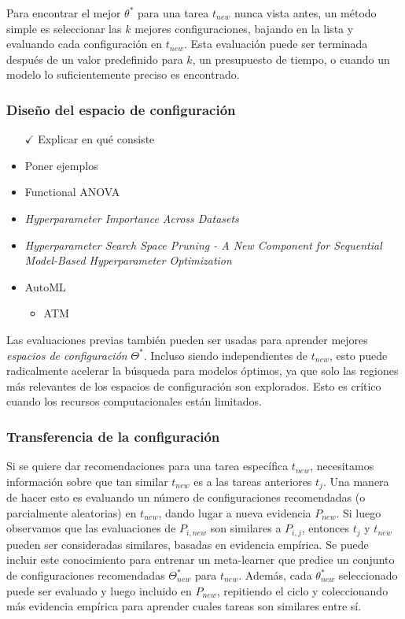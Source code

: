 Para encontrar el mejor $\theta^*$ para una tarea $t_{new}$ nunca vista antes, un método simple es seleccionar las $k$ mejores configuraciones, bajando en la lista y evaluando cada configuración en $t_{new}$. Esta evaluación puede ser terminada después de un valor predefinido para $k$, un presupuesto de tiempo, o cuando un modelo lo suficientemente preciso es encontrado. 

\subsubsection{Diseño del espacio de configuración}

\begin{itemize}
	\item[$\checkmark$] Explicar en qué consiste
	\item Poner ejemplos
	\item Functional ANOVA
	\item \textit{Hyperparameter Importance Across Datasets}
	\item \textit{Hyperparameter Search Space Pruning - A New Component for Sequential Model-Based Hyperparameter Optimization}
	\item AutoML \begin{itemize}
		\item ATM
	\end{itemize}
\end{itemize}


Las evaluaciones previas también pueden ser usadas para aprender mejores \textit{espacios de configuración} $\Theta^*$. Incluso siendo independientes de $t_{new}$, esto puede radicalmente acelerar la búsqueda para modelos óptimos, ya que solo las regiones más relevantes de los espacios de configuración son explorados. Esto es crítico cuando los recursos computacionales están limitados. 

\subsubsection{Transferencia de la configuración}

Si se quiere dar recomendaciones para una tarea específica $t_{new}$, necesitamos información sobre que tan similar $t_{new}$ es a las tareas anteriores $t_j$. Una manera de hacer esto es evaluando un número de configuraciones recomendadas (o parcialmente aleatorias) en $t_{new}$, dando lugar a nueva evidencia $P_{new}$. Si luego observamos que las evaluaciones de $P_{i,new}$ son similares a $P_{i,j}$, entonces $t_j$ y $t_{new}$ pueden ser consideradas similares, basadas en evidencia empírica. Se puede incluir este conocimiento para entrenar un meta-learner que predice un conjunto de configuraciones recomendadas $\Theta_{new}^*$ para $t_{new}$. Además, cada $\theta^*_{new}$ seleccionado puede ser evaluado y luego incluido en $P_{new}$, repitiendo el ciclo y coleccionando más evidencia empírica para aprender cuales tareas son similares entre sí.


